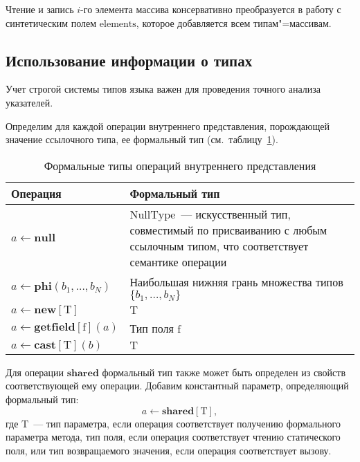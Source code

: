 \documentclass[14pt,titlepage,draft]{extarticle}
\newcommand{\java}{\eng{Java}\xspace}
\newcommand{\type}[1]{\mathrm{#1}}
\newcommand{\field}[1]{\mathrm{#1}}
\newcommand{\op}[1]{\mathbf{#1}}
\begin{document}
    Чтение и запись $i$-го элемента массива консервативно преобразуется в
    работу с синтетическим полем $\field{elements}$, которое добавляется всем
    типам"=массивам.

  \subsection{Использование информации о типах}
    \label{section:op_types}

    Учет строгой системы типов языка \java важен для проведения точного анализа
    указателей.

    Определим для каждой операции внутреннего представления, порождающей
    значение ссылочного типа, ее формальный тип
    (см.~таблицу~\ref{tabular:ops_types}).

    \begin{table}[htb]
      \centering

      \begin{tabular}{|p{}|p{}|}\hline
        \textbf{Операция} &
          \textbf{Формальный тип}\\ \hline

        $a \gets \op{null}$
        & $\type{NullType}$~--- искусственный тип, совместимый по
          присваиванию с любым ссылочным типом, что соответствует
          семантике операции
        \\ \hline

        $a \gets \op{phi}(b_1, \ldots, b_N)$
        & Наибольшая нижняя грань множества типов $\{b_1, \ldots, b_N\}$
        \\ \hline

        $a \gets \op{new}[\type{T}]$
        & $\type{T}$
        \\ \hline

        $a \gets \op{getfield}[\field{f}](a)$
        & Тип поля $\field{f}$
        \\ \hline

        $a \gets \op{cast}[\type{T}](b)$
        & $\type{T}$
        \\ \hline

      \end{tabular}
      \caption{Формальные типы операций внутреннего представления}
      \label{tabular:ops_types}
    \end{table}

    Для операции $\op{shared}$ формальный тип также может быть определен из
    свойств соответствующей ему \java операции.
    Добавим константный параметр, определяющий формальный тип:
    \[a \gets \op{shared}[\type{T}],\]
    где $\type{T}$~--- тип параметра, если операция соответствует
    получению формального параметра метода, тип поля, если операция
    соответствует чтению статического поля, или тип возвращаемого значения,
    если операция соответствует вызову.
\end{document}
